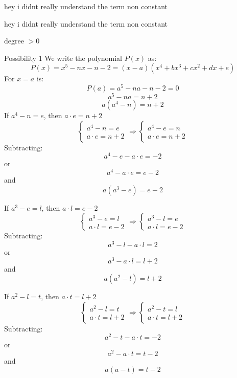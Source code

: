\begin{solution}
	hey i didnt really understand the term non constant
\end{solution}



\begin{solution}
	\begin{tcolorbox}hey i didnt really understand the term non constant\end{tcolorbox}
degree $>0$
\end{solution}



\begin{solution}
	Possibility 1
We write the polynomial $P(x)$ as:
\[P(x)=x^{5}-nx-n-2=(x-a)(x^{4}+bx^{3}+cx^{2}+dx+e)\]
For $x=a$ is:
\[P(a)=a^{5}-na-n-2=0\]
\[a^{5}-na=n+2\]
\[a(a^{4}-n)=n+2\]
If $a^{4}-n=e$, then $a\cdot e=n+2$
\[ \left\{\begin{array}{l}{a^{4}-n=e}\\ {a\cdot e=n+2}\end{array}\right. \Rightarrow
 \left\{\begin{array}{l}{a^{4}-e=n}\\ {a\cdot e=n+2}\end{array}\right. \]
Subtracting:
\[a^{4}-e-a\cdot e=-2\]
or\[a^{4}-a\cdot e=e-2\]and \[a(a^{3}-e)=e-2\]

If $a^{3}-e=l$, then $a\cdot l=e-2$
\[ \left\{\begin{array}{l}{a^{3}-e=l}\\ {a\cdot l=e-2}\end{array}\right. \Rightarrow
 \left\{\begin{array}{l}{a^{3}-l=e}\\ {a\cdot l=e-2}\end{array}\right. \]
Subtracting:
\[a^{3}-l-a\cdot l=2\]
or\[a^{3}-a\cdot l=l+2\]and \[a(a^{2}-l)=l+2\]

If $a^{2}-l=t$, then $a\cdot t=l+2$
\[ \left\{\begin{array}{l}{a^{2}-l=t}\\ {a\cdot t=l+2}\end{array}\right. \Rightarrow
 \left\{\begin{array}{l}{a^{2}-t=l}\\ {a\cdot t=l+2}\end{array}\right. \]
Subtracting:
\[a^{2}-t-a\cdot t=-2\]
or\[a^{2}-a\cdot t=t-2\]and \[a(a-t)=t-2\]


\end{solution}
